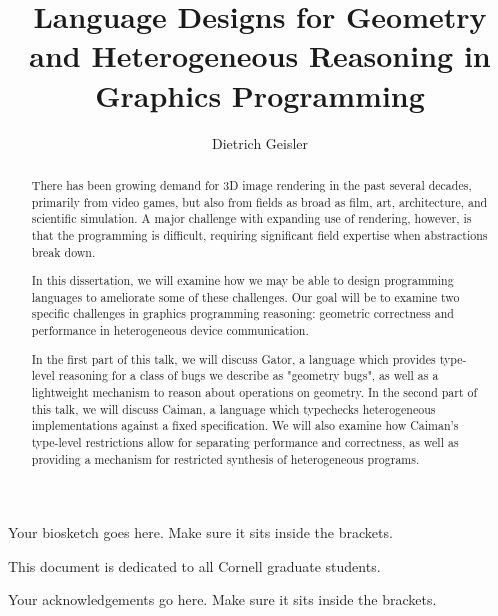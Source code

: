 \documentclass[phd,tocprelim]{cornell}
\title {Language Designs for Geometry and Heterogeneous Reasoning in Graphics Programming}
\author {Dietrich Geisler}
\begin{document}
\maketitle
\makecopyright

\mathligson

\begin{abstract}
There has been growing demand for 3D image rendering in the past several decades, primarily from video games, but also from fields as broad as film, art, architecture, and scientific simulation.  A major challenge with expanding use of rendering, however, is that the programming is difficult, requiring significant field expertise when abstractions break down.

In this dissertation, we will examine how we may be able to design programming languages to ameliorate some of these challenges.  Our goal will be to examine two specific challenges in graphics programming reasoning: geometric correctness and performance in heterogeneous device communication.  

In the first part of this talk, we will discuss Gator, a language which provides type-level reasoning for a class of bugs we describe as "geometry bugs", as well as a lightweight mechanism to reason about operations on geometry.  In the second part of this talk, we will discuss Caiman, a language which typechecks heterogeneous implementations against a fixed specification.  We will also examine how Caiman's type-level restrictions allow for separating performance and correctness, as well as providing a mechanism for restricted synthesis of heterogeneous programs.
\end{abstract}

\begin{biosketch}
Your biosketch goes here. Make sure it sits inside
the brackets.
\end{biosketch}

\begin{dedication}
This document is dedicated to all Cornell graduate students.
\end{dedication}

\begin{acknowledgements}
Your acknowledgements go here. Make sure it sits inside the brackets.
\end{acknowledgements}

\contentspage
\tablelistpage
\figurelistpage

\normalspacing \setcounter{page}{1} 
\pagestyle{cornell} \addtolength{\parskip}{0.5\baselineskip}
\end{document}
